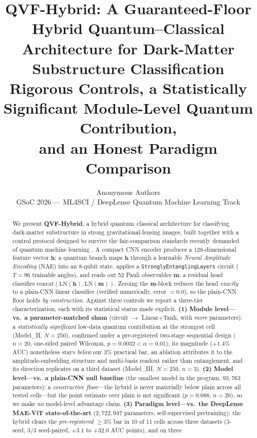 \documentclass[10pt,letterpaper]{article}
\title{\textbf{QVF-Hybrid: A Guaranteed-Floor Hybrid Quantum--Classical\\
Architecture for Dark-Matter Substructure Classification}\\[4pt]
\large Rigorous Controls, a Statistically Significant Module-Level Quantum Contribution,\\
and an Honest Paradigm Comparison}
\author{%
  Anonymous Authors\\[2pt]
  GSoC 2026 --- ML4SCI / DeepLense Quantum Machine Learning Track
}
\date{}
\theoremstyle{plain}
\theoremstyle{definition}
\begin{document}
\maketitle

\begin{abstract}
We present \textbf{QVF-Hybrid}, a hybrid quantum--classical architecture for
classifying dark-matter substructure in strong gravitational-lensing images,
built together with a control protocol designed to survive the fair-comparison
standards recently demanded of quantum machine learning
\cite{bowles2024,schnabel2025}.
A compact CNN encoder produces a 128-dimensional feature vector $\mathbf{h}$;
a quantum branch maps $\mathbf{h}$ through a learnable
\emph{Neural Amplitude Encoding} (NAE) into an 8-qubit state, applies a
\texttt{StronglyEntanglingLayers} circuit ($T{=}96$ trainable angles), and reads
out 52 Pauli observables $\mathbf{m}$; a residual head classifies
$\mathrm{concat}(\mathrm{LN}(\mathbf{h}), \mathrm{LN}(\mathbf{m}))$.
Zeroing the $\mathbf{m}$-block reduces the head \emph{exactly} to a plain-CNN
linear classifier (verified numerically, error $=0.0$), so the plain-CNN floor
holds \emph{by construction}.
Against three controls we report a three-tier characterization, each with its
statistical status made explicit.
\textbf{(1) Module level---vs.\ a parameter-matched sham} (circuit $\to$
Linear$+$Tanh, with \emph{more} parameters): a \emph{statistically significant}
low-data quantum contribution at the strongest cell (Model\_II, $N{=}250$),
confirmed under a pre-registered two-stage sequential design ($n{=}20$, one-sided
paired Wilcoxon, $p{=}0.0032 < \alpha{=}0.01$); its magnitude ($+1.4\%$ AUC)
nonetheless stays \emph{below} our $3\%$ practical bar, an ablation attributes it
to the amplitude-embedding structure and multi-basis readout rather than
entanglement, and its direction replicates on a third dataset (Model\_III,
$N{=}250$, $n{=}3$).
\textbf{(2) Model level---vs.\ a plain-CNN null baseline} (the smallest model in
the program, $93{,}763$ parameters): a \emph{constructive floor}---the hybrid is
never materially below plain across all tested cells---but the point estimate over
plain is not significant ($p{=}0.088$, $n{=}20$), so we make \emph{no} model-level
advantage claim.
\textbf{(3) Paradigm level---vs.\ the DeepLense MAE-ViT state-of-the-art}
($2{,}722{,}947$ parameters, self-supervised pretraining): the hybrid clears the
\emph{pre-registered} $\geq 3\%$ bar in 10 of 11 cells across three datasets
($3$-seed, $3/3$ seed-paired, $+3.1$ to $+32.0$ AUC points), and on three

\end{abstract}
\end{document}
